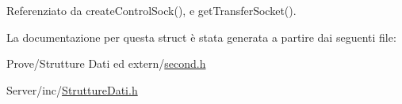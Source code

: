 Referenziato da create\+Control\+Sock(), e get\+Transfer\+Socket().



La documentazione per questa struct è stata generata a partire dai seguenti file\+:\begin{DoxyCompactItemize}
\item 
Prove/\+Strutture Dati ed extern/\hyperlink{second_8h}{second.\+h}\item 
Server/inc/\hyperlink{StruttureDati_8h}{Strutture\+Dati.\+h}\end{DoxyCompactItemize}
